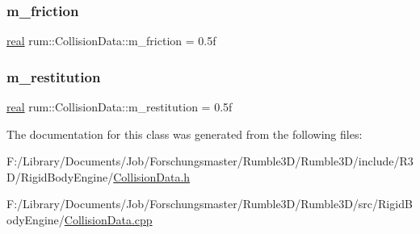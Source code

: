 \subsubsection{\texorpdfstring{m\+\_\+friction}{m\_friction}}
{\footnotesize\ttfamily \hyperlink{namespacerum_a7e8cca23573d5eaead0f138cbaa4862c}{real} rum\+::\+Collision\+Data\+::m\+\_\+friction = 0.\+5f\hspace{0.3cm}{\ttfamily [protected]}}

\mbox{\label{classrum_1_1_collision_data_ab28c985d5b8554f548a485cac367c1fd}} 
\subsubsection{\texorpdfstring{m\+\_\+restitution}{m\_restitution}}
{\footnotesize\ttfamily \hyperlink{namespacerum_a7e8cca23573d5eaead0f138cbaa4862c}{real} rum\+::\+Collision\+Data\+::m\+\_\+restitution = 0.\+5f\hspace{0.3cm}{\ttfamily [protected]}}



The documentation for this class was generated from the following files\+:\begin{DoxyCompactItemize}
\item 
F\+:/\+Library/\+Documents/\+Job/\+Forschungsmaster/\+Rumble3\+D/\+Rumble3\+D/include/\+R3\+D/\+Rigid\+Body\+Engine/\hyperlink{_collision_data_8h}{Collision\+Data.\+h}\item 
F\+:/\+Library/\+Documents/\+Job/\+Forschungsmaster/\+Rumble3\+D/\+Rumble3\+D/src/\+Rigid\+Body\+Engine/\hyperlink{_collision_data_8cpp}{Collision\+Data.\+cpp}\end{DoxyCompactItemize}
